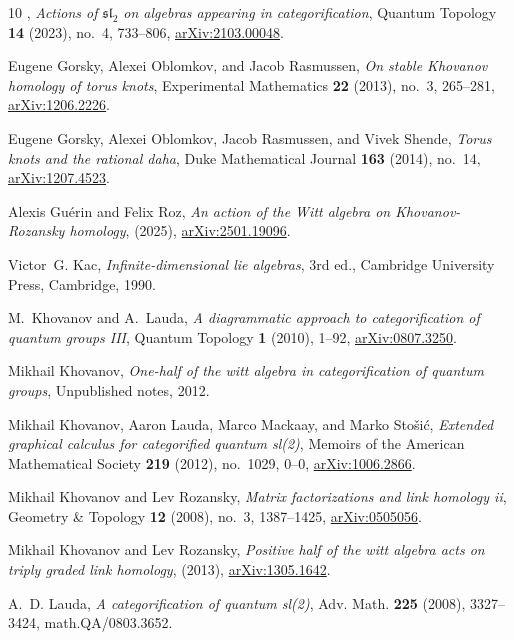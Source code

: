 \documentclass{amsart}
\numberwithin{equation}{section}
\theoremstyle{definition}
\begin{document}
\begin{thebibliography}{10}
\bysame, \emph{Actions of {$\mathfrak{sl}_2$} on algebras appearing in categorification}, Quantum Topology \textbf{14} (2023), no.~4, 733–806, \href{https://arxiv.org/abs/2103.00048}{arXiv:2103.00048}.

Eugene Gorsky, Alexei Oblomkov, and Jacob Rasmussen, \emph{On stable {K}hovanov homology of torus knots}, Experimental Mathematics \textbf{22} (2013), no.~3, 265–281, \href{https://arxiv.org/abs/1206.2226}{arXiv:1206.2226}.

Eugene Gorsky, Alexei Oblomkov, Jacob Rasmussen, and Vivek Shende, \emph{Torus knots and the rational daha}, Duke Mathematical Journal \textbf{163} (2014), no.~14, \href{https://arxiv.org/abs/1207.4523}{arXiv:1207.4523}.

Alexis Guérin and Felix Roz, \emph{An action of the {W}itt algebra on {K}hovanov-{R}ozansky homology},  (2025), \href{https://www.arxiv.org/abs/2501.19096}{arXiv:2501.19096}.

Victor~G. Kac, \emph{Infinite-dimensional lie algebras}, 3rd ed., Cambridge University Press, Cambridge, 1990.

M.~Khovanov and A.~Lauda, \emph{A diagrammatic approach to categorification of quantum groups {III}}, Quantum Topology \textbf{1} (2010), 1--92, \href{http://arxiv.org/abs/0807.3250}{arXiv:0807.3250}.

Mikhail Khovanov, \emph{One-half of the witt algebra in categorification of quantum groups}, Unpublished notes, 2012.

Mikhail Khovanov, Aaron Lauda, Marco Mackaay, and Marko Stošić, \emph{Extended graphical calculus for categorified quantum sl(2)}, Memoirs of the American Mathematical Society \textbf{219} (2012), no.~1029, 0–0, \href{https://arxiv.org/abs/1006.2866}{arXiv:1006.2866}.

Mikhail Khovanov and Lev Rozansky, \emph{Matrix factorizations and link homology ii}, Geometry \& Topology \textbf{12} (2008), no.~3, 1387–1425, \href{https://arxiv.org/abs/math/0505056}{arXiv:0505056}.

Mikhail Khovanov and Lev Rozansky, \emph{Positive half of the witt algebra acts on triply graded link homology},  (2013), \href{https://arxiv.org/abs/1305.1642}{arXiv:1305.1642}.

A.~D. Lauda, \emph{A categorification of quantum sl(2)}, Adv. Math. \textbf{225} (2008), 3327--3424, math.QA/0803.3652.


\end{thebibliography}
\end{document}
